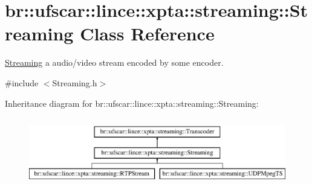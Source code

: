 \hypertarget{classbr_1_1ufscar_1_1lince_1_1xpta_1_1streaming_1_1Streaming}{
\section{br::ufscar::lince::xpta::streaming::Streaming Class Reference}
\label{classbr_1_1ufscar_1_1lince_1_1xpta_1_1streaming_1_1Streaming}
}


\hyperlink{classbr_1_1ufscar_1_1lince_1_1xpta_1_1streaming_1_1Streaming}{Streaming} a audio/video stream encoded by some encoder.  




{\ttfamily \#include $<$Streaming.h$>$}

Inheritance diagram for br::ufscar::lince::xpta::streaming::Streaming:\begin{figure}[H]
\begin{center}
\leavevmode
\includegraphics[height=3cm]{classbr_1_1ufscar_1_1lince_1_1xpta_1_1streaming_1_1Streaming}
\end{center}
\end{figure}
